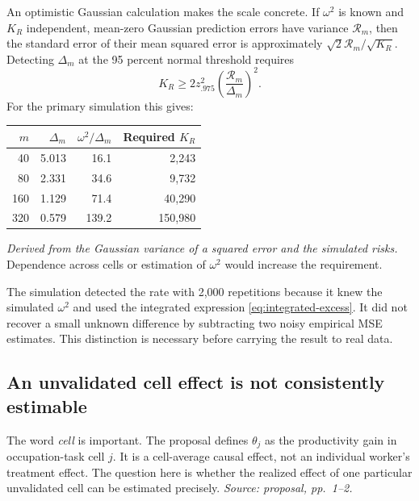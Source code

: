 \documentclass[11pt]{article}
\begin{document}
An optimistic Gaussian calculation makes the scale concrete. If
\(\omega^2\) is known and \(K_R\) independent, mean-zero Gaussian prediction
errors have variance \(\mathcal R_m\), then the standard error of their mean
squared error is approximately
\(\sqrt{2}\mathcal R_m/\sqrt{K_R}\). Detecting \(\Delta_m\)
at the 95 percent normal threshold requires
\begin{equation}
 K_R
 \geq
 2z_{.975}^2
 \left(\frac{\mathcal R_m}{\Delta_m}\right)^2.
 \label{eq:detection-count}
\end{equation}
For the primary simulation this gives:
\begin{center}
\begin{tabular}{r r r r}
\hline
\(m\) & \(\Delta_m\) & \(\omega^2/\Delta_m\) & Required \(K_R\) \\
\hline
40  & 5.013 & 16.1  & 2,243 \\
80  & 2.331 & 34.6  & 9,732 \\
160 & 1.129 & 71.4  & 40,290 \\
320 & 0.579 & 139.2 & 150,980 \\
\hline
\end{tabular}
\end{center}
\emph{Derived from the Gaussian variance of a squared error and the simulated
risks.} Dependence across cells or estimation of \(\omega^2\) would increase
the requirement.

The simulation detected the rate with 2,000 repetitions because it knew the
simulated \(\omega^2\) and used the integrated expression
\eqref{eq:integrated-excess}. It did not recover a small unknown difference
by subtracting two noisy empirical MSE estimates. This distinction is
necessary before carrying the result to real data.

\subsection*{An unvalidated cell effect is not consistently estimable}

The word \emph{cell} is important. The proposal defines \(\theta_j\) as the
productivity gain in occupation-task cell \(j\). It is a cell-average causal
effect, not an individual worker's treatment effect. The question here is
whether the realized effect of one particular unvalidated cell can be
estimated precisely. \emph{Source: proposal, pp.~1--2.}
\end{document}
